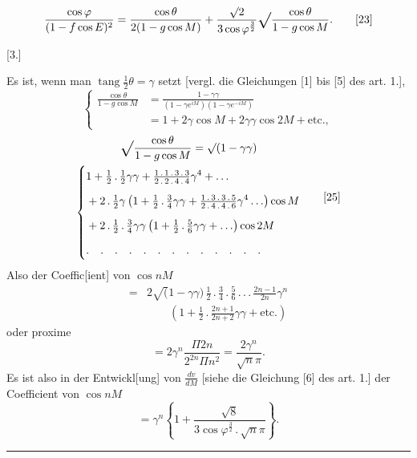 \begin{equation}\frac{\cos\varphi}{(1-f\cos E)^2}=\frac{\cos\theta}{2(1-g\cos M)}+\frac{\surd2}{3\cos\varphi^{\frac32}}\vsroot{\frac{\cos\theta}{1-g\cos M}}.\tag*{[23]}\end{equation}
\begin{center}[3.]\end{center}
\noindent\hspace*{\parindent}Es ist, wenn man \(\operatorname{tang}\tfrac12\theta=\gamma\) setzt [vergl. die Gleichungen [1] bis [5] des art. 1.],
\begin{equation}\left\{\begin{aligned}
\frac{\cos\theta}{1-g\cos M}&=\frac{1-\gamma\gamma}{(1-\gamma e^{iM})(1-\gamma e^{-iM})}\\
 &=1+2\gamma\cos M+2\gamma\gamma\cos 2M+\text{etc.},
\end{aligned}\right.\tag*{[24]}\end{equation}
\begingroup\small
\begin{equation}\begin{gathered}
\vsroot{\frac{\cos\theta}{1-g\cos M}}=\surd(1-\gamma\gamma)\\
\left\{\begin{aligned}
&1+\tfrac12\,{.}\,\tfrac12\gamma\gamma+\tfrac{1\,{.}\,1\,{.}\,3\,{.}\,3}{2\,{.}\,2\,{.}\,4\,{.}\,4}\gamma^4+{.}\,{.}\,{.}\\
&+2\,{.}\,\tfrac12\gamma\left(1+\tfrac12\,{.}\,\tfrac34\gamma\gamma+\tfrac{1\,{.}\,3\,{.}\,3\,{.}\,5}{2\,{.}\,4\,{.}\,4\,{.}\,6}\gamma^4\,{.}\,{.}\,{.}\right)\cos M\\
&+2\,{.}\,\tfrac12\,{.}\,\tfrac34\gamma\gamma\left(1+\tfrac12\,{.}\,\tfrac56\gamma\gamma+{.}\,{.}\,{.}\right)\cos 2M\\
&{.}\quad{.}\quad{.}\quad{.}\quad{.}\quad{.}\quad{.}\quad{.}\quad{.}\quad{.}\quad{.}\quad{.}\quad{.}
\end{aligned}\right.
\end{gathered}\tag*{[25]}\end{equation}
\endgroup
\noindent Also der Coeffic[ient] von \(\cos nM\)
\begin{equation}\begin{aligned}
={}&2\surd(1-\gamma\gamma)\,\frac12\,{.}\,\frac34\,{.}\,\frac56\,{.}\,{.}\,{.}\,\frac{2n-1}{2n}\gamma^n\\
 &\qquad\left(1+\frac12\,{.}\,\frac{2n+1}{2n+2}\gamma\gamma+\text{etc.}\right)
\end{aligned}\tag*{[26]}\end{equation}
\noindent oder proxime
\begin{equation}=2\gamma^n\frac{\Pi2n}{2^{2n}\Pi n^2}=\frac{2\gamma^n}{\surd n\pi}.\tag*{[27]}\end{equation}
\noindent Es ist also in der Entwickl[ung] von \(\frac{dv}{dM}\) [siehe die Gleichung [6] des art. 1.] der Coefficient von \(\cos nM\)
\begin{equation}=\gamma^n\!\left\{1+\frac{\surd8}{3\cos\varphi^{\frac32}\,{.}\,\surd n\pi}\right\}.\tag*{[28]}\end{equation}
\begin{center}\rule{.24\linewidth}{.4pt}\end{center}
\clearpage\endgroup
